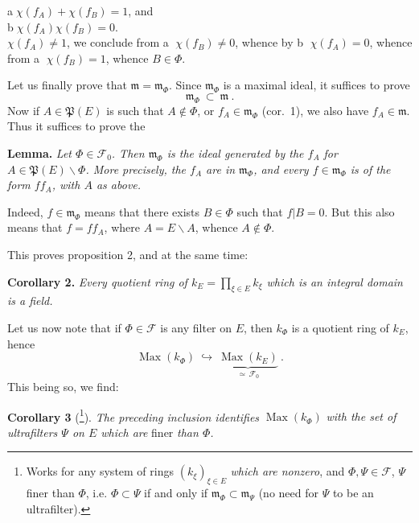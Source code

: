 \documentclass[11pt]{article}
\newcommand{\printedpage}[1]{\marginpar{\footnotesize p.~#1}}
\newcommand{\msp}[1]{\marginpar{\footnotesize [#1]}}
\begin{document}
\printedpage{194}

\noindent\hspace*{1em}\textcircled{a}\quad $\chi(f_A)+\chi(f_B)=1$, and\\
\hspace*{1em}\textcircled{b}\quad $\chi(f_A)\chi(f_B)=0$.\\
$\chi(f_A)\neq 1$, we conclude from \textcircled{a} $\chi(f_B)\neq 0$, whence by \textcircled{b} $\chi(f_A)=0$, whence from \textcircled{a} $\chi(f_B)=1$, whence $B\in\Phi$.

\msp{page 7}
Let us finally prove that $\mathfrak{m}=\mathfrak{m}_\Phi$. Since $\mathfrak{m}_\Phi$ is a maximal ideal, it suffices to prove
\[
\mathfrak{m}_\Phi\ \subset\ \mathfrak{m}\ .
\]
Now if $A\in\mathfrak{P}(E)$ is such that $A\notin\Phi$, or $f_A\in\mathfrak{m}_\Phi$ (cor.~1), we also have $f_A\in\mathfrak{m}$. Thus it suffices to prove the

\textbf{Lemma.} \textit{Let $\Phi\in\mathcal{F}_0$. Then $\mathfrak{m}_\Phi$ is the ideal generated by the $f_A$ for $A\in\mathfrak{P}(E)\backslash\Phi$. More precisely, the $f_A$ are in $\mathfrak{m}_\Phi$, and every $f\in\mathfrak{m}_\Phi$ is of the form $ff_A$, with $A$ as above.}

Indeed, $f\in\mathfrak{m}_\Phi$ means that there exists $B\in\Phi$ such that $f|B=0$. But this also means that $f=ff_A$, where $A=E\backslash A$, whence $A\notin\Phi$.

This proves proposition 2, and at the same time:

\textbf{Corollary 2.} \textit{Every quotient ring of $k_E=\prod_{\xi\in E}k_\xi$ which is an integral domain is a field.}

Let us now note that if $\Phi\in\mathcal{F}$ is any filter on $E$, then $k_\Phi$ is a quotient ring of $k_E$, hence
\[
\operatorname{Max}(k_\Phi)\ \hookrightarrow\ \underbrace{\operatorname{Max}(k_E)}_{\simeq\,\mathcal{F}_0}\ . \tag*{$(*)$}
\]
This being so, we find:

\textbf{Corollary 3} (\footnote[206]{Works for any system of rings $(k_\xi)_{\xi\in E}$ \textit{which are nonzero}, and $\Phi,\Psi\in\mathcal{F}$, $\Psi$ finer than $\Phi$, i.e. $\Phi\subset\Psi$ if and only if $\mathfrak{m}_\Phi\subset\mathfrak{m}_\Psi$ (no need for $\Psi$ to be an ultrafilter).}). \textit{The preceding inclusion identifies} $\operatorname{Max}(k_\Phi)$ \textit{with the set of ultrafilters $\Psi$ on $E$ which are} finer \textit{than $\Phi$.}
\end{document}
